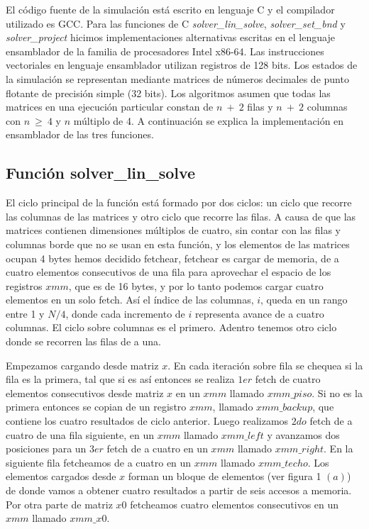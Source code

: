 El código fuente de la simulación está escrito en lenguaje C y el compilador utilizado es GCC. Para las funciones de C \textit{solver\_lin\_solve}, \textit{solver\_set\_bnd} y \textit{solver\_project} hicimos implementaciones alternativas escritas en el lenguaje ensamblador de la familia de procesadores Intel x86-64. Las instrucciones vectoriales en lenguaje ensamblador utilizan registros de 128 bits. Los estados de la simulación se representan mediante matrices de números decimales de punto flotante de precisión simple (32 bits). Los algoritmos asumen que todas las matrices en una ejecución particular constan de $n\ +\ 2$ filas y $n\ +\ 2$ columnas con $n\ \geq\ 4$ y $n$ múltiplo de 4. A continuación se explica la implementación en ensamblador de las tres funciones.
\subsection{Función solver\_lin\_solve}
\par El ciclo principal de la función está formado por dos ciclos: un ciclo que recorre las columnas de las matrices y otro ciclo que recorre las filas. A causa de que las matrices contienen dimensiones múltiplos de 
cuatro, sin contar con las filas y columnas borde que no se usan en esta función, y los elementos
de las matrices ocupan 4 bytes hemos decidido fetchear, fetchear es cargar de memoria, de a cuatro elementos consecutivos de una fila para aprovechar el espacio de los registros $xmm$, que es
de 16 bytes, y por lo tanto podemos cargar cuatro elementos en un solo fetch. Así el índice de
las columnas, $i$, queda en un rango entre 1 y $N/4$, donde cada incremento de $i$ representa avance de a cuatro columnas. El ciclo sobre columnas es el primero.  
Adentro tenemos otro ciclo donde se recorren las filas de a una. \newline

\par Empezamos cargando desde matriz $x$.
 En cada iteración sobre fila se chequea si la fila es la primera, tal que si es así entonces 
 se realiza $1er$ fetch de cuatro elementos consecutivos desde matriz $x$ en un $xmm$ llamado $xmm\_piso$. Si no es la primera entonces se copian de un registro $xmm$, llamado $xmm\_backup$, que contiene los 
 cuatro resultados de ciclo anterior.
 Luego realizamos $2do$ fetch de a cuatro de una fila siguiente, en un $xmm$ llamado
 $xmm\_left$ y avanzamos dos posiciones para un $3er$ fetch de a cuatro en un $xmm$ llamado $xmm\_right$.
 En la siguiente fila fetcheamos de a cuatro en un $xmm$ llamado $xmm\_techo$. Los elementos cargados desde $x$ forman un bloque de elementos (ver figura 1 $(a)$) de donde vamos a obtener cuatro resultados a partir de seis accesos a memoria.
 Por otra parte de matriz $x0$ fetcheamos cuatro elementos consecutivos en un $xmm$ llamado $xmm\_x0$.\newline

